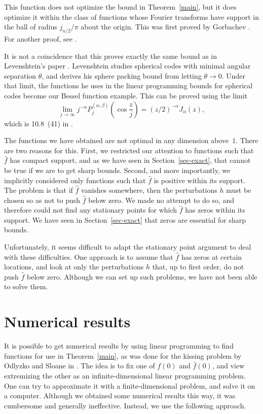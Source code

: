 This function does not optimize the bound in Theorem~\ref{main},
but it does optimize it within the class of functions whose
Fourier transforms have support in the ball of radius
$j_{n/2}/\pi$ about the origin.  This was first proved by
Gorbachev \cite{Go}.  For another proof, see \cite{C}.

It is not a coincidence that this proves exactly the same bound
as in Levenshtein's paper \cite{Lev}.  Levenshtein studies
spherical codes with minimal angular separation $\theta$, and
derives his sphere packing bound from letting $\theta \rightarrow
0$.  Under that limit, the functions he uses in the linear
programming bounds for spherical codes become our Bessel function
example.  This can be proved using the limit
\begin{equation}
\label{bmp}
\lim_{j \rightarrow \infty} j^{-\alpha}
P_j^{(\alpha,\beta)}\left(\cos \frac{z}{j}\right) =
(z/2)^{-\alpha} J_\alpha(z),
\end{equation}
which is 10.8~(41) in \cite{EMOT}.

The functions we have obtained are not optimal in any dimension
above~$1$.  There are two reasons for this.  First, we restricted
our attention to functions such that $\widehat{f}$ has compact
support, and as we have seen in Section~\ref{sec-exact}, that
cannot be true if we are to get sharp bounds. Second, and more
importantly, we implicitly considered only functions such that
$\widehat{f}$ is positive within its support.  The problem is
that if $\widehat{f}$ vanishes somewhere, then the perturbations
$h$ must be chosen so as not to push $\widehat{f}$ below zero. We
made no attempt to do so, and therefore could not find any
stationary points for which $\widehat{f}$ has zeros within its
support.  We have seen in Section~\ref{sec-exact} that zeros are
essential for sharp bounds.

Unfortunately, it seems difficult to adapt the stationary point
argument to deal with these difficulties.  One approach is to
assume that $\widehat{f}$ has zeros at certain locations, and
look at only the perturbations $h$ that, up to first order, do
not push $\widehat{f}$ below zero.  Although we can set up such
problems, we have not been able to solve them.

\section{Numerical results}
\label{sec-numerical}

It is possible to get numerical results by using linear
programming to find functions for use in Theorem~\ref{main}, as
was done for the kissing problem by Odlyzko and Sloane in
\cite{OS}.  The idea is to fix one of $f(0)$ and $\widehat{f}(0)$,
and view extremizing the other as an infinite-dimensional linear
programming problem.  One can try to approximate it with a
finite-dimensional problem, and solve it on a computer.  Although
we obtained some numerical results this way, it was cumbersome and
generally ineffective. Instead, we use the following approach.

